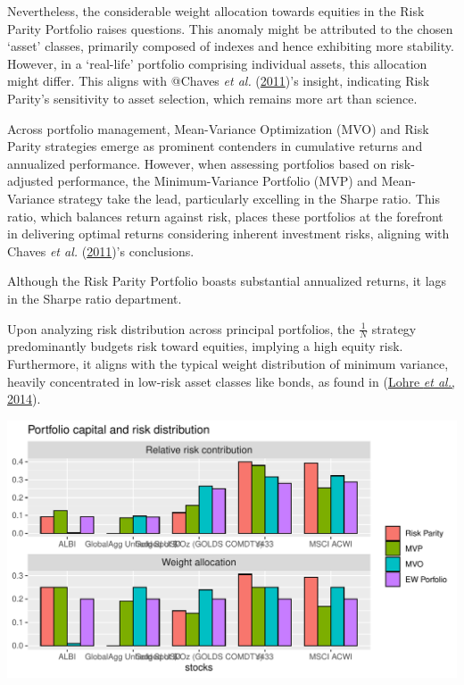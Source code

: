 \documentclass[12pt,preprint, authoryear]{elsarticle}
\let\origfigure\figure
\let\endorigfigure\endfigure
\renewenvironment{figure}[1][2] {
    \expandafter\origfigure\expandafter[H]
} {
    \endorigfigure
}
\numberwithin{equation}{section}
\numberwithin{figure}{section}
\numberwithin{table}{section}
\begin{document}
Nevertheless, the considerable weight allocation towards equities in the
Risk Parity Portfolio raises questions. This anomaly might be attributed
to the chosen `asset' classes, primarily composed of indexes and hence
exhibiting more stability. However, in a `real-life' portfolio
comprising individual assets, this allocation might differ. This aligns
with @Chaves \emph{et al.}
(\protect\hyperlink{ref-chaves2011risk}{2011})'s insight, indicating
Risk Parity's sensitivity to asset selection, which remains more art
than science.

Across portfolio management, Mean-Variance Optimization (MVO) and Risk
Parity strategies emerge as prominent contenders in cumulative returns
and annualized performance. However, when assessing portfolios based on
risk-adjusted performance, the Minimum-Variance Portfolio (MVP) and
Mean-Variance strategy take the lead, particularly excelling in the
Sharpe ratio. This ratio, which balances return against risk, places
these portfolios at the forefront in delivering optimal returns
considering inherent investment risks, aligning with Chaves \emph{et
al.} (\protect\hyperlink{ref-chaves2011risk}{2011})'s conclusions.

Although the Risk Parity Portfolio boasts substantial annualized
returns, it lags in the Sharpe ratio department.

Upon analyzing risk distribution across principal portfolios, the
\(\frac{1}{N}\) strategy predominantly budgets risk toward equities,
implying a high equity risk. Furthermore, it aligns with the typical
weight distribution of minimum variance, heavily concentrated in
low-risk asset classes like bonds, as found in
(\protect\hyperlink{ref-lohre2014diversifying}{Lohre \emph{et al.},
2014}).

\begin{figure}[H]

{\centering \includegraphics{Finmetrics_Project_files/figure-latex/Figure1-1} 

}

\caption{Relative risk contribution and Weights allocation of different portfolios \label{Figure1}}\label{fig:Figure1}
\end{figure}
\end{document}
